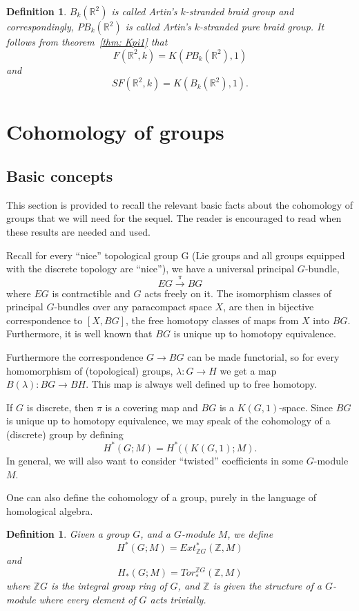 \documentclass{amsart}
\newtheorem{defn}[thm]{Definition}
\begin{document}
\begin{defn}
$B_k(\mathbb{R}^2)$ is called Artin's $k$-stranded braid group
and correspondingly, $PB_k(\mathbb{R}^2)$ is called Artin's $k$-stranded
pure braid group.
It follows from theorem~\ref{thm: Kpi1} that
$$
F(\mathbb{R}^2,k) = K(PB_k(\mathbb{R}^2),1)
$$
and
$$
SF(\mathbb{R}^2,k) = K(B_k(\mathbb{R}^2),1).
$$
\end{defn}

\section{Cohomology of groups}
\subsection{Basic concepts}

This section is provided to recall the relevant basic facts about the cohomology
of groups that we will need for the sequel. The reader is encouraged to read
when these results are needed and used.

Recall for every ``nice'' topological group G (Lie groups and all groups 
equipped with the
discrete topology are ``nice''), we have a universal principal $G$-bundle,
$$
EG \overset{\pi}{\rightarrow} BG
$$
where $EG$ is contractible and $G$ acts freely on it. 
The isomorphism classes of principal $G$-bundles over 
any 
paracompact space $X$, are then in bijective correspondence to $[X,BG]$,
the free homotopy classes of maps from $X$ into $BG$. Furthermore, it is
well known that $BG$ is unique up to homotopy equivalence.

Furthermore the correspondence $G \rightarrow BG$ can be made functorial,
so for every homomorphism of (topological) 
groups, $\lambda: G \rightarrow H$ we get a map
$B(\lambda): BG \rightarrow BH$. This map is always well defined up to 
free homotopy. 

If $G$ is discrete, then $\pi$ is a covering map and $BG$ is a $K(G,1)$-space.
Since $BG$ is unique up to homotopy equivalence, 
we may speak of the cohomology of a (discrete) group by defining
$$
H^*(G;M) = H^*((K(G,1);M).
$$
In general, we will also want to consider
``twisted'' coefficients in some $G$-module $M$.

One can also define the cohomology of a group, purely in the language of
homological algebra. 

\begin{defn}
Given a group $G$, and a $G$-module $M$, we define 
$$
H^*(G;M) = Ext^*_{\mathbb{Z}G}(\mathbb{Z}, M) 
$$
and
$$
H_*(G;M) = Tor_*^{\mathbb{Z}G}(\mathbb{Z}, M)
$$
where $\mathbb{Z}G$ is the integral group ring of $G$, and $\mathbb{Z}$
is given the structure of a $G$-module where every element of $G$ acts 
trivially.
\end{defn}
\end{document}
